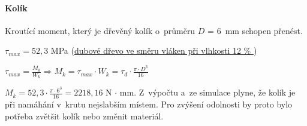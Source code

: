 \begin{minipage}{\textwidth}
\paragraph*{Kolík}    
Kroutící moment, který je dřevěný kolík o~průměru $D$ = 6~mm schopen přenést. %

$ \tau_{max} = 52,3 $ MPa (\href{https://is.mendelu.cz/eknihovna/opory/zobraz_cast.pl?fit_w=1;cast=9190}{dubové dřevo ve směru vláken při vlhkosti 12 \% } \parencite{pevnost_dreva})

$ \tau_{max} = \frac{M_k}{W_k} \Rightarrow M_k = \tau_{max} \cdot W_k = \tau _d \cdot \frac{\pi \cdot D^3}{16} $

$ M_k = 52,3 \cdot \frac{\pi \cdot 6^3}{16} = 2 218,16 $ N $\cdot$ mm. Z~výpočtu a~ze simulace plyne, že kolík je při namáhání v~krutu nejslabším místem. Pro zvýšení odolnosti by proto bylo 
potřeba zvětšit kolík nebo změnit materiál.
\end{minipage}